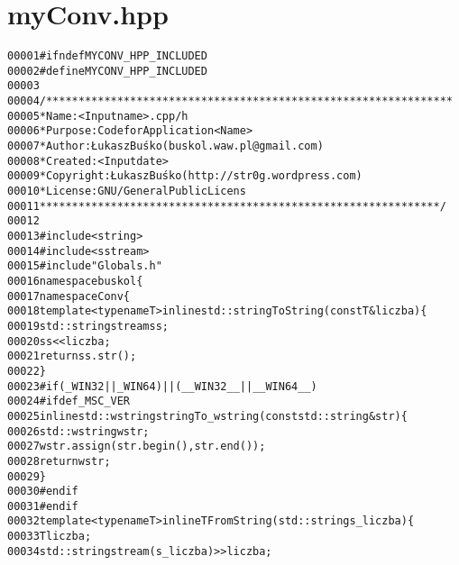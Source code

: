 \hypertarget{myConv_8hpp_source}{
\section{myConv.hpp}
}


\begin{footnotesize}\begin{alltt}
00001 \textcolor{preprocessor}{#ifndef MYCONV\_HPP\_INCLUDED}
00002 \textcolor{preprocessor}{}\textcolor{preprocessor}{#define MYCONV\_HPP\_INCLUDED}
00003 \textcolor{preprocessor}{}
00004 \textcolor{comment}{/***************************************************************}
00005 \textcolor{comment}{ * Name:      <Input name>.cpp/h}
00006 \textcolor{comment}{ * Purpose:   Code for Application <Name>}
00007 \textcolor{comment}{ * Author:    Łukasz Buśko (buskol.waw.pl@gmail.com)}
00008 \textcolor{comment}{ * Created:   <Input date>}
00009 \textcolor{comment}{ * Copyright: Łukasz Buśko (http://str0g.wordpress.com)}
00010 \textcolor{comment}{ * License:   GNU / General Public Licens}
00011 \textcolor{comment}{ **************************************************************/}
00012 
00013 \textcolor{preprocessor}{#include <string>}
00014 \textcolor{preprocessor}{#include <sstream>}
00015 \textcolor{preprocessor}{#include "Globals.h"}
00016 \textcolor{keyword}{namespace }buskol\{
00017     \textcolor{keyword}{namespace }Conv\{
00018         \textcolor{keyword}{template} <\textcolor{keyword}{typename} T> \textcolor{keyword}{inline} std::string ToString(\textcolor{keyword}{const} T& liczba)\{
00019             std::stringstream ss;
00020             ss << liczba;
00021             \textcolor{keywordflow}{return} ss.str();
00022         \}
00023 \textcolor{preprocessor}{        #if ( \_WIN32 || \_WIN64 ) || ( \_\_WIN32\_\_ || \_\_WIN64\_\_ )}
00024 \textcolor{preprocessor}{}\textcolor{preprocessor}{            #ifdef \_MSC\_VER}
00025 \textcolor{preprocessor}{}            \textcolor{keyword}{inline} std::wstring stringTo\_wstring(\textcolor{keyword}{const} std::string& str)\{
00026                 std::wstring wstr;
00027                 wstr.assign(str.begin(),str.end());
00028                 \textcolor{keywordflow}{return} wstr;
00029             \}
00030 \textcolor{preprocessor}{            #endif}
00031 \textcolor{preprocessor}{}\textcolor{preprocessor}{        #endif}
00032 \textcolor{preprocessor}{}        \textcolor{keyword}{template} <\textcolor{keyword}{typename} T> \textcolor{keyword}{inline} T FromString(std::string s\_liczba)\{
00033         T liczba;
00034         std::stringstream(s\_liczba) >> liczba;

\end{alltt}
\end{footnotesize}
